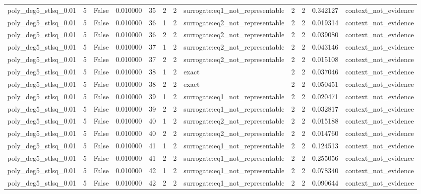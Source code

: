 \begin{tabular}{lrrrrrrlrrrl}
poly\_deg5\_stlsq\_0.01 & 5 & False & 0.010000 & 35 & 2 & 2 & surrogate:eq1\_not\_representable & 2 & 2 & 0.342127 & context\_not\_evidence \\
poly\_deg5\_stlsq\_0.01 & 5 & False & 0.010000 & 36 & 1 & 2 & surrogate:eq2\_not\_representable & 2 & 2 & 0.019314 & context\_not\_evidence \\
poly\_deg5\_stlsq\_0.01 & 5 & False & 0.010000 & 36 & 2 & 2 & surrogate:eq2\_not\_representable & 2 & 2 & 0.039080 & context\_not\_evidence \\
poly\_deg5\_stlsq\_0.01 & 5 & False & 0.010000 & 37 & 1 & 2 & surrogate:eq2\_not\_representable & 2 & 2 & 0.043146 & context\_not\_evidence \\
poly\_deg5\_stlsq\_0.01 & 5 & False & 0.010000 & 37 & 2 & 2 & surrogate:eq2\_not\_representable & 2 & 2 & 0.015108 & context\_not\_evidence \\
poly\_deg5\_stlsq\_0.01 & 5 & False & 0.010000 & 38 & 1 & 2 & exact & 2 & 2 & 0.037046 & context\_not\_evidence \\
poly\_deg5\_stlsq\_0.01 & 5 & False & 0.010000 & 38 & 2 & 2 & exact & 2 & 2 & 0.050451 & context\_not\_evidence \\
poly\_deg5\_stlsq\_0.01 & 5 & False & 0.010000 & 39 & 1 & 2 & surrogate:eq1\_not\_representable & 2 & 2 & 0.020471 & context\_not\_evidence \\
poly\_deg5\_stlsq\_0.01 & 5 & False & 0.010000 & 39 & 2 & 2 & surrogate:eq1\_not\_representable & 2 & 2 & 0.032817 & context\_not\_evidence \\
poly\_deg5\_stlsq\_0.01 & 5 & False & 0.010000 & 40 & 1 & 2 & surrogate:eq2\_not\_representable & 2 & 2 & 0.015188 & context\_not\_evidence \\
poly\_deg5\_stlsq\_0.01 & 5 & False & 0.010000 & 40 & 2 & 2 & surrogate:eq2\_not\_representable & 2 & 2 & 0.014760 & context\_not\_evidence \\
poly\_deg5\_stlsq\_0.01 & 5 & False & 0.010000 & 41 & 1 & 2 & surrogate:eq1\_not\_representable & 2 & 2 & 0.124513 & context\_not\_evidence \\
poly\_deg5\_stlsq\_0.01 & 5 & False & 0.010000 & 41 & 2 & 2 & surrogate:eq1\_not\_representable & 2 & 2 & 0.255056 & context\_not\_evidence \\
poly\_deg5\_stlsq\_0.01 & 5 & False & 0.010000 & 42 & 1 & 2 & surrogate:eq1\_not\_representable & 2 & 2 & 0.078340 & context\_not\_evidence \\
poly\_deg5\_stlsq\_0.01 & 5 & False & 0.010000 & 42 & 2 & 2 & surrogate:eq1\_not\_representable & 2 & 2 & 0.090644 & context\_not\_evidence \\

\end{tabular}
